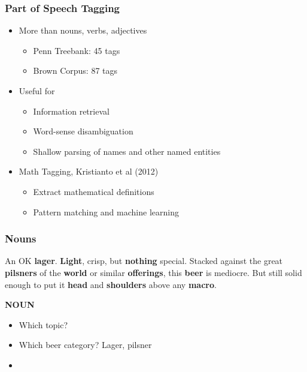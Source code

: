 \begin{frame}
    \frametitle{Part of Speech Tagging}
\begin{itemize}
    \item More than nouns, verbs, adjectives
        \begin{itemize}
        \item Penn Treebank: 45 tags
        \item Brown Corpus: 87 tags
        \end{itemize}
        \end{itemize}
\begin{itemize}
    \item Useful for
        \begin{itemize}
        \item Information retrieval
        \item Word-sense disambiguation
        \item Shallow parsing of names and other named entities
        \end{itemize}
     \end{itemize}
     \begin{itemize}
    \item Math Tagging, \textcolor{iseblue}{Kristianto et al (2012)}
         \begin{itemize}
    \item Extract mathematical definitions
    \item Pattern matching and machine learning
\end{itemize}
\end{itemize}

\end{frame}


\begin{frame}
    \frametitle{Nouns}
    \label{review_nouns}
\begin{spacing}{1.6}
    An OK \textbf{\textcolor{isered}{lager}}. \textbf{\textcolor{isered}{Light}}, crisp, but \textbf{\textcolor{isered}{nothing}} special. Stacked against the great \textbf{\textcolor{isered}{pilsners}} of the \textbf{\textcolor{isered}{world}} or similar \textbf{\textcolor{isered}{offerings}}, this \textbf{\textcolor{isered}{beer}} is mediocre. But still solid enough to put it \textbf{\textcolor{isered}{head}} and \textbf{\textcolor{isered}{shoulders}} above any \textbf{\textcolor{isered}{macro}}.
\end{spacing}

\vspace{-10pt}
\begin{flushright}
    \textbf{\textcolor{isered}{NOUN}}
\end{flushright}

\vspace{-10pt}
\begin{itemize}
\item Which topic?
\item Which beer category? Lager, pilsner
\item \hyperlink{stats_nouns}{}
\end{itemize}
\end{frame}


